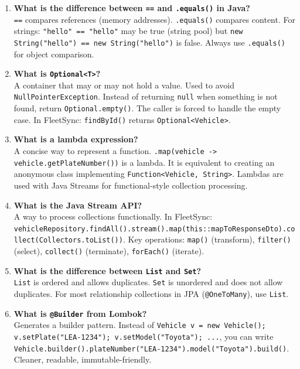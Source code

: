 \documentclass[12pt,a4paper]{report}
\newcommand{\code}[1]{\texttt{\textcolor{keywordblue}{#1}}}
\begin{document}
\begin{enumerate}[resume]
  \item \textbf{What is the difference between \code{==} and \code{.equals()} in Java?}\\
  \code{==} compares references (memory addresses). \code{.equals()} compares content. For strings: \code{"hello" == "hello"} may be true (string pool) but \code{new String("hello") == new String("hello")} is false. Always use \code{.equals()} for object comparison.

  \item \textbf{What is \code{Optional<T>}?}\\
  A container that may or may not hold a value. Used to avoid \code{NullPointerException}. Instead of returning \code{null} when something is not found, return \code{Optional.empty()}. The caller is forced to handle the empty case. In FleetSync: \code{findById()} returns \code{Optional<Vehicle>}.

  \item \textbf{What is a lambda expression?}\\
  A concise way to represent a function. \code{.map(vehicle -> vehicle.getPlateNumber())} is a lambda. It is equivalent to creating an anonymous class implementing \code{Function<Vehicle, String>}. Lambdas are used with Java Streams for functional-style collection processing.

  \item \textbf{What is the Java Stream API?}\\
  A way to process collections functionally. In FleetSync: \code{vehicleRepository.findAll().stream().map(this::mapToResponseDto).collect(Collectors.toList())}. Key operations: \code{map()} (transform), \code{filter()} (select), \code{collect()} (terminate), \code{forEach()} (iterate).

  \item \textbf{What is the difference between \code{List} and \code{Set}?}\\
  \code{List} is ordered and allows duplicates. \code{Set} is unordered and does not allow duplicates. For most relationship collections in JPA (\code{@OneToMany}), use \code{List}.

  \item \textbf{What is \code{@Builder} from Lombok?}\\
  Generates a builder pattern. Instead of \code{Vehicle v = new Vehicle(); v.setPlate("LEA-1234"); v.setModel("Toyota"); ...}, you can write \code{Vehicle.builder().plateNumber("LEA-1234").model("Toyota").build()}. Cleaner, readable, immutable-friendly.
\end{enumerate}
\end{document}
